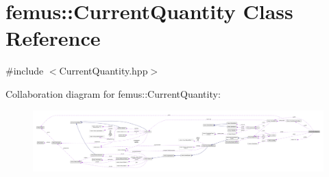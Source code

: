 \hypertarget{classfemus_1_1_current_quantity}{}\section{femus\+:\+:Current\+Quantity Class Reference}
\label{classfemus_1_1_current_quantity}


{\ttfamily \#include $<$Current\+Quantity.\+hpp$>$}



Collaboration diagram for femus\+:\+:Current\+Quantity\+:
\nopagebreak
\begin{figure}[H]
\begin{center}
\leavevmode
\includegraphics[width=350pt]{classfemus_1_1_current_quantity__coll__graph}
\end{center}
\end{figure}
